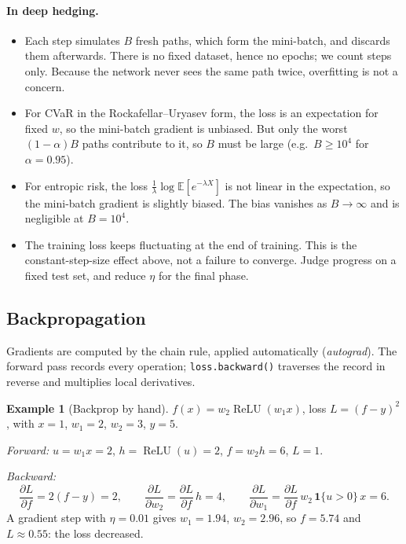 \documentclass[11pt]{article}
\theoremstyle{definition}
\newtheorem{example}[theorem]{Example}
\theoremstyle{remark}
\newcommand{\relu}{\operatorname{ReLU}}
\begin{document}
\paragraph{In deep hedging.}
\begin{itemize}
  \item Each step simulates $B$ fresh paths, which form the mini-batch, and discards them afterwards. There is no fixed dataset, hence no epochs;
        we count steps only. Because the network never sees the same path twice, overfitting is not a concern.
  \item For CVaR in the Rockafellar--Uryasev form, the loss is an expectation for fixed $w$, so the mini-batch gradient is unbiased. But only the
        worst $(1-\alpha)B$ paths contribute to it, so $B$ must be large (e.g.\ $B\ge10^4$ for $\alpha=0.95$).
  \item For entropic risk, the loss $\frac1\lambda\log\mathbb E[e^{-\lambda X}]$ is not linear in the expectation, so the mini-batch gradient is
        slightly biased. The bias vanishes as $B\to\infty$ and is negligible at $B=10^4$.
  \item The training loss keeps fluctuating at the end of training. This is the constant-step-size effect above, not a failure to converge.
        Judge progress on a fixed test set, and reduce $\eta$ for the final phase.
\end{itemize}

\subsection{Backpropagation}

Gradients are computed by the chain rule, applied automatically (\emph{autograd}). The forward pass
records every operation; \texttt{loss.backward()} traverses the record in reverse and multiplies local derivatives.

\begin{example}[Backprop by hand]
$f(x)=w_2\relu(w_1x)$, loss $L=(f-y)^2$, with $x=1$, $w_1=2$, $w_2=3$, $y=5$.

\emph{Forward:} $u=w_1x=2$, $h=\relu(u)=2$, $f=w_2h=6$, $L=1$.

\emph{Backward:}
\[
\frac{\partial L}{\partial f}=2(f-y)=2,\qquad
\frac{\partial L}{\partial w_2}=\frac{\partial L}{\partial f}\,h=4,\qquad
\frac{\partial L}{\partial w_1}=\frac{\partial L}{\partial f}\,w_2\,\mathbf 1\{u>0\}\,x=6 .
\]
A gradient step with $\eta=0.01$ gives $w_1=1.94$, $w_2=2.96$, so $f=5.74$ and $L\approx0.55$: the loss decreased.
\end{example}
\end{document}
